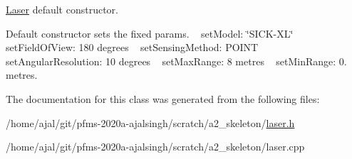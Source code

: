 \hyperlink{classLaser}{Laser} default constructor. 

Default constructor sets the fixed params. ~\newline
 set\+Model\+: \char`\"{}\+S\+I\+C\+K-\/\+X\+L\char`\"{} ~\newline
 set\+Field\+Of\+View\+: 180 degrees ~\newline
 set\+Sensing\+Method\+: P\+O\+I\+NT ~\newline
 set\+Angular\+Resolution\+: 10 degrees ~\newline
 set\+Max\+Range\+: 8 metres ~\newline
 set\+Min\+Range\+: 0. metres. 

The documentation for this class was generated from the following files\+:\begin{DoxyCompactItemize}
\item 
/home/ajal/git/pfms-\/2020a-\/ajalsingh/scratch/a2\+\_\+skeleton/\hyperlink{laser_8h}{laser.\+h}\item 
/home/ajal/git/pfms-\/2020a-\/ajalsingh/scratch/a2\+\_\+skeleton/laser.\+cpp\end{DoxyCompactItemize}

